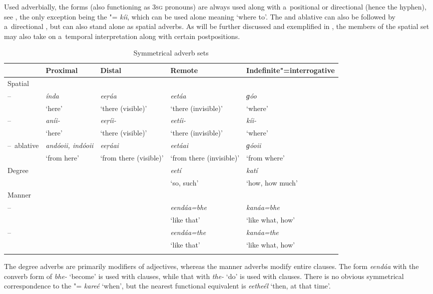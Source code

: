 Used adverbially, the  forms (also functioning as \textsc{3sg}  pronouns) are always used
along with a~positional or directional  (hence the hyphen), see , the only
exception being the "= \textit{kíi}, which can be used alone meaning
`where to'. The  and ablative can also be followed by a~directional , but can
also stand alone as spatial adverbs. As will be further discussed and exemplified in , the
members of the spatial set may also take on a~temporal interpretation along with certain
postpositions.


\begin{table}[ht]
\caption{Symmetrical {adverb} sets}
\begin{tabularx}{\textwidth}{ l Q Q Q Q }
\lsptoprule
&
Proximal &
Distal &
Remote &
Indefinite"=interrogative\\\midrule
Spatial &
&
&
&
\\
--~ &
\textit{índa} &
\textit{eeṛáa} &
\textit{eetáa} &
\textit{ɡóo} \\
&
`here' &
`there (visible)' &
`there (invisible)' &
`where'\\
--~ &
\textit{aníi-} &
\textit{eeṛíi-} &
\textit{eetíi-} &
\textit{kíi-} \\
&
`here' &
`there (visible)' &
`there (invisible)' &
`where'\\
--~ablative &
\textit{andóoii, indóoii} &
\textit{eeṛáai} &
\textit{eetáai} &
\textit{ɡóoii} \\
&
`from here' &
`from there (visible)' &
`from there (invisible)' &
`from where'\\
Degree &
&
&
\textit{eetí} &
\textit{katí} \\
&
&
&
`so, such' &
`how, how much'\\
Manner &
&
&
&
\\
--~ &
&
&
\textit{eendáa=bhe} &
\textit{kanáa=bhe} \\
&
&
&
`like that' &
`like what, how'\\
--~ &
&
&
\textit{eendáa=the} &
\textit{kanáa=the} \\
&
&
&
`like that' &
`like what, how'\\\lspbottomrule
\end{tabularx}
\label{tab:7-1}
\end{table}

The degree adverbs are primarily modifiers of adjectives, whereas the manner adverbs modify entire clauses. The form \textit{eendáa} with the converb form of \textit{bhe-} `become' is used with  clauses, while that with \textit{the-} `do' is used with  clauses. There is no obvious symmetrical correspondence to the "=  \textit{kareé} `when', but the nearest functional equivalent is \textit{eetheél} `then, at that time'. 

